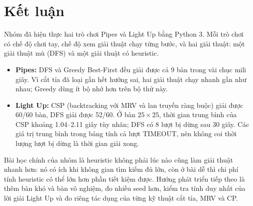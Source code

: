 \documentclass[12pt,a4paper]{article}
\begin{document}



\section*{Kết luận}
Nhóm đã hiện thực hai trò chơi Pipes và Light Up bằng Python 3. Mỗi trò chơi
có chế độ chơi tay, chế độ xem giải thuật chạy từng bước, và hai giải thuật:
một giải thuật mù (DFS) và một giải thuật có heuristic.

\begin{itemize}
\item \textbf{Pipes:} DFS và Greedy Best-First đều giải được cả 9 bàn trong vài
chục mili giây. Vì cắt tỉa đã loại gần hết hướng sai, hai giải thuật chạy nhanh
gần như nhau; Greedy dùng ít bộ nhớ hơn trên bộ thử này.
\item \textbf{Light Up:} CSP (backtracking với MRV và lan truyền ràng buộc) giải
được 60/60 bàn, DFS giải được 52/60. Ở bàn $25\times25$, thời gian trung bình
của CSP khoảng 1.04--2.11 giây tùy nhãn; DFS có 8 lượt bị dừng sau 30 giây.
Các giá trị trung bình trong bảng tính cả lượt TIMEOUT, nên không coi thời
lượng lượt bị dừng là thời gian giải xong.
\end{itemize}

Bài học chính của nhóm là heuristic không phải lúc nào cũng làm giải thuật nhanh
hơn: nó có ích khi không gian tìm kiếm đủ lớn, còn ở bài dễ thì chi phí tính
heuristic có thể lớn hơn phần tiết kiệm được. Hướng phát triển tiếp theo là thêm
bàn khó và bàn vô nghiệm, đo nhiều seed hơn, kiểm tra tính duy nhất của lời giải
Light Up và đo riêng tác dụng của từng kỹ thuật cắt tỉa, MRV và CP.
\end{document}
